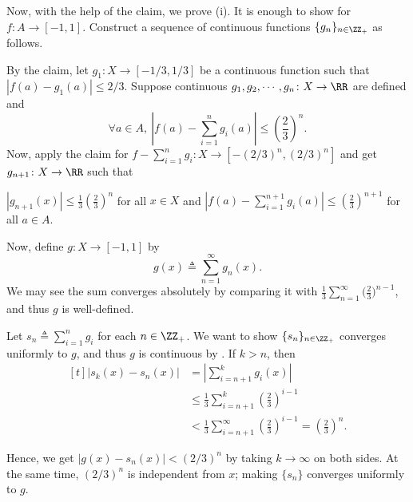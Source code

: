 \documentclass[MAS331_Note.tex]{subfiles}
\begin{document}
{    Now, with the help of the claim, we prove (i). It is enough to show for
    $f \colon A \to [-1, 1]$. Construct a sequence of continuous functions
    $\{g_n\}_{n \in \ZZ_+}$ as follows.
    \begin{itemize}[nolistsep]
        \ii By the claim, let $g_1 \colon X \to [-1/3, 1/3]$ be a continuous
            function such that $|f(a) - g_1(a)| \le 2/3$.
        \ii Suppose continuous $g_1, g_2, \cdots, g_n \colon X \to \RR$ are defined and
            \[
                \forall a \in A,\: \left|f(a) - \sum_{i=1}^{n} g_i(a)\right|
                \le \left(\frac{2}{3}\right)^n\text{.}
            \]
            Now, apply the claim for $f - \sum_{i=1}^{n} g_i \colon X \to
            [-(2/3)^n, (2/3)^n]$ and get $g_{n+1} \colon X \to \RR$
            such that
            \begin{itemize}[nolistsep]
                \ii $\displaystyle |g_{n+1}(x)|
                \le \frac{1}{3} \left(\frac{2}{3}\right)^n$
                    for all $x \in X$ and
                    \ii $\displaystyle \left|f(a) - \sum_{i=1}^{n+1} g_i(a)\right|
                    \le \left(\frac{2}{3}\right)^{n+1}$ for all $a \in A$.
            \end{itemize}
    \end{itemize}
    
    Now, define $g \colon X \to [-1, 1]$ by
    \[
        g(x) \triangleq \sum_{n=1}^{\infty} g_n(x)\text{.}
    \]
    We may see the sum converges absolutely by comparing it with
    $\frac{1}{3} \sum_{n=1}^{\infty} \big(\frac{2}{3}\big)^{n-1}$, and thus
    $g$ is well-defined.

    Let $s_n \triangleq \sum_{i=1}^{n} g_i$ for each $n \in \ZZ_+$. We want
    to show $\{s_n\}_{n \in \ZZ_+}$ converges uniformly to $g$, and thus
    $g$ is continuous by .
    If $k > n$, then
    \[
        \begin{aligned}[t]
            |s_k(x) - s_n(x)| &= \left|\sum_{i=n+1}^{k} g_i(x)\right| \\
                              &\le \frac{1}{3} \sum_{i=n+1}^{k} \left(\frac{2}{3}\right)^{i-1} \\
                              &< \frac{1}{3} \sum_{i=n+1}^{\infty} \left(\frac{2}{3}\right)^{i-1}
                              = \left(\frac{2}{3}\right)^n\text{.}
        \end{aligned}
    \]

    Hence, we get $|g(x) - s_n(x)| < (2/3)^n$ by taking $k \to \infty$ on both
    sides. At the same time, $(2/3)^n$ is independent from $x$; making $\{s_n\}$
    converges uniformly to $g$.

}
\end{document}
